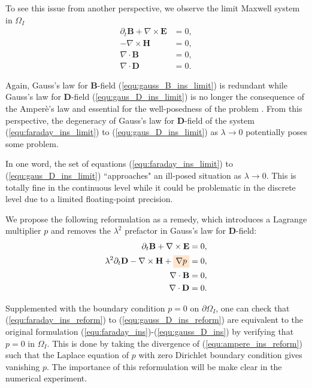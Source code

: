\documentclass{article}
\begin{document}
To see this issue from another perspective, we observe the limit Maxwell system in $\Omega_I$
\begin{subequations}
\begin{align}
    \partial_t \mathbf{B} + \nabla \times \mathbf{E} &= 0, \label{equ:faraday_ins_limit}\\ 
    - \nabla \times \mathbf{H} &= 0,  \label{equ:ampere_ins_limit}\\
    \nabla \cdot \mathbf{B} &= 0, \label{equ:gauss_B_ins_limit}\\
    \nabla \cdot \mathbf{D} &= 0 \label{equ:gaus_D_ins_limit}.
\end{align}
\end{subequations}

Again, Gauss's law for $\mathbf{B}$-field (\ref{equ:gauss_B_ins_limit}) is redundant while Gauss's law for $\mathbf{D}$-field (\ref{equ:gaus_D_ins_limit}) is no longer the consequence of the Amper\`{e}'s law and essential for the well-posedness of the problem \citep{ana_2010}. From this perspective, the degeneracy of Gauss's law for $\mathbf{D}$-field of the system (\ref{equ:faraday_ins_limit}) to (\ref{equ:gaus_D_ins_limit}) as $\lambda \rightarrow 0$ potentially poses some problem.

In one word, the set of equations (\ref{equ:faraday_ins_limit}) to (\ref{equ:gaus_D_ins_limit}) ``approaches" an ill-posed situation as $\lambda \rightarrow 0$. This is totally fine in the continuous level while it could be problematic in the discrete level due to a limited floating-point precision. 

We propose the following reformulation as a remedy, which introduces a Lagrange multiplier $p$ and removes the $\lambda^2$ prefactor in Gauss's law for $\mathbf{D}$-field:
\begin{subequations}
\begin{align}
    \partial_t \mathbf{B} + \nabla \times \mathbf{E} &= 0, \label{equ:faraday_ins_reform}\\ 
    \lambda^2 \partial_t \mathbf{D} - \nabla \times \mathbf{H} + \colorbox{orange!20}{$\nabla p$} &= 0,  \label{equ:ampere_ins_reform}\\
    \nabla \cdot \mathbf{B} &= 0, \label{equ:gauss_B_ins_reform}\\
    \nabla \cdot \mathbf{D} &= 0 \label{equ:gauss_D_ins_reform}.
\end{align}
\end{subequations}

Supplemented with the boundary condition $p = 0$ on $\partial\Omega_I$, one can check that (\ref{equ:faraday_ins_reform}) to (\ref{equ:gauss_D_ins_reform}) are equivalent to the original formulation (\ref{equ:faraday_ins})-(\ref{equ:gauss_D_ins}) by verifying that $p = 0$ in $\Omega_I$. This is done by taking the divergence of (\ref{equ:ampere_ins_reform}) such that the Laplace equation of $p$ with zero Dirichlet boundary condition gives vanishing $p$. The importance of this reformulation will be make clear in the numerical experiment. 
\end{document}
